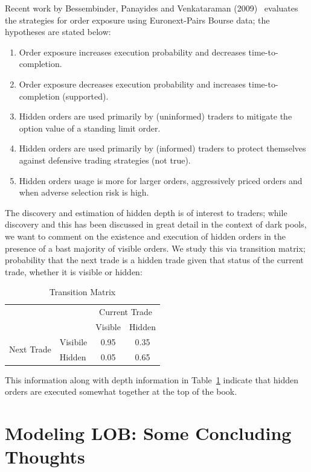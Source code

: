 Recent work by Bessembinder, Panayides and Venkataraman (2009)~\cite{bessenbinder} evaluates the strategies for order exposure using Euronext-Pairs Bourse data; the hypotheses are stated below:
\begin{enumerate}[--]
\item Order exposure increases execution probability and decreases time-to-completion.
\item Order exposure decreases execution probability and increases time-to-completion (supported).
\item Hidden orders are used primarily by (uninformed) traders to mitigate the option value of a standing limit order.
\item Hidden orders are used primarily by (informed) traders to protect themselves against defensive trading strategies (not true).
\item Hidden orders usage is more for larger orders, aggressively priced orders and when adverse selection risk is high.
\end{enumerate}
The discovery and estimation of hidden depth is of interest to traders; while discovery and this has been discussed in great detail in the context of dark pools, we want to comment on the existence and execution of hidden orders in the presence of a bast majority of visible orders. We study this via transition matrix; probability that the next trade is a hidden trade given that status of the current trade, whether it is visible or hidden:
	\begin{table}[!ht]
	\centering
	\caption{Transition Matrix \label{tab:transmatrix}}
	\begin{tabular}{c l | cc}
	& & \multicolumn{2}{c}{Current Trade} \\
	& & Visible & Hidden \\ \hline
	\multirow{2}{*}{Next Trade} & Visibile & 0.95 & 0.35 \\
	& Hidden & 0.05 & 0.65
	\end{tabular}
	\end{table}
This information along with depth information in Table~\ref{tab:transmatrix} indicate that hidden orders are executed somewhat together at the top of the book. 



\section{Modeling LOB: Some Concluding Thoughts}

